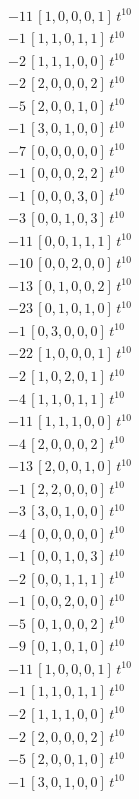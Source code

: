 \begin{align*}
-11\,[1,0,0,0,1]\,t^{10} \\
-1\,[1,1,0,1,1]\,t^{10} \\
-2\,[1,1,1,0,0]\,t^{10} \\
-2\,[2,0,0,0,2]\,t^{10} \\
-5\,[2,0,0,1,0]\,t^{10} \\
-1\,[3,0,1,0,0]\,t^{10} \\
-7\,[0,0,0,0,0]\,t^{10} \\
-1\,[0,0,0,2,2]\,t^{10} \\
-1\,[0,0,0,3,0]\,t^{10} \\
-3\,[0,0,1,0,3]\,t^{10} \\
-11\,[0,0,1,1,1]\,t^{10} \\
-10\,[0,0,2,0,0]\,t^{10} \\
-13\,[0,1,0,0,2]\,t^{10} \\
-23\,[0,1,0,1,0]\,t^{10} \\
-1\,[0,3,0,0,0]\,t^{10} \\
-22\,[1,0,0,0,1]\,t^{10} \\
-2\,[1,0,2,0,1]\,t^{10} \\
-4\,[1,1,0,1,1]\,t^{10} \\
-11\,[1,1,1,0,0]\,t^{10} \\
-4\,[2,0,0,0,2]\,t^{10} \\
-13\,[2,0,0,1,0]\,t^{10} \\
-1\,[2,2,0,0,0]\,t^{10} \\
-3\,[3,0,1,0,0]\,t^{10} \\
-4\,[0,0,0,0,0]\,t^{10} \\
-1\,[0,0,1,0,3]\,t^{10} \\
-2\,[0,0,1,1,1]\,t^{10} \\
-1\,[0,0,2,0,0]\,t^{10} \\
-5\,[0,1,0,0,2]\,t^{10} \\
-9\,[0,1,0,1,0]\,t^{10} \\
-11\,[1,0,0,0,1]\,t^{10} \\
-1\,[1,1,0,1,1]\,t^{10} \\
-2\,[1,1,1,0,0]\,t^{10} \\
-2\,[2,0,0,0,2]\,t^{10} \\
-5\,[2,0,0,1,0]\,t^{10} \\
-1\,[3,0,1,0,0]\,t^{10}
\end{align*}
